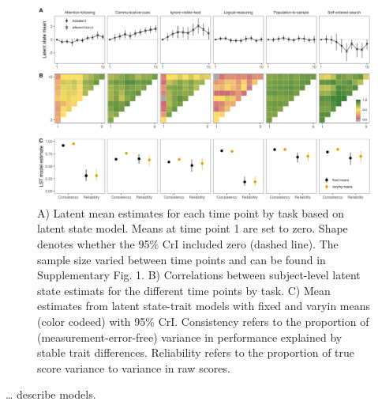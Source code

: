 \documentclass[
  man,floatsintext]{apa6}
\begin{document}
\begin{figure}

{\centering \includegraphics[width=1\linewidth]{../visuals/ls_lst} 

}

\caption{A) Latent mean estimates for each time point by task based on latent state model. Means at time point 1 are set to zero. Shape denotes whether the 95\% CrI included zero (dashed line). The sample size varied between time points and can be found in Supplementary Fig. 1.  B) Correlations between subject-level latent state estimats for the different time points by task. C) Mean estimates from latent state-trait models with fixed and varyin means (color codeed) with 95\% CrI. Consistency refers to the proportion of (measurement-error-free) variance in performance explained by stable trait differences. Reliability refers to the proportion of true score variance to variance in raw scores.}\label{fig:figsem}
\end{figure}

\ldots{} describe models.
\end{document}

